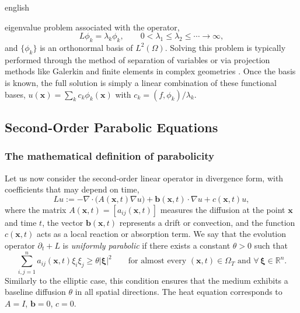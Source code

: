\documentclass[11pt,letterpaper,twoside,openright]{book} %
\newcommand{\abs}[1]{\left\lvert #1 \right\rvert}
\begin{document}
\begin{hyphenrules}{english}
\begin{enumerate}
    eigenvalue problem associated with the operator,
    \begin{equation}
      L\phi_k=\lambda_k\phi_k,\qquad 0<\lambda_1\le\lambda_2\le\cdots\to\infty,
      \label{eq:eigen}
    \end{equation}
    and $\{\phi_k\}$ is an orthonormal basis of $L^2(\Omega)$. Solving this problem is typically
    performed through the method of separation of variables \cite{evans2010} or via projection
    methods like Galerkin and finite elements in complex geometries \cite{zienkiewicz2013}. Once
    the basis is known, the full solution is simply a linear combination of these functional bases,
    $u(\mathbf{x})=\sum_k c_k\phi_k(\mathbf{x})$ with $c_k=(f,\phi_k)/\lambda_k$.
\end{enumerate}

\subsection{Second-Order Parabolic Equations}\label{subsec:parabolic}

\subsubsection{The mathematical definition of parabolicity}
Let us now consider the second-order linear operator in divergence form, with coefficients that may
depend on time,
\begin{equation}
  Lu:=-\nabla\cdot\big(A(\mathbf{x},t)\nabla u\big)+\mathbf{b}(\mathbf{x},t)\cdot\nabla u+c(\mathbf{x},t)u,
  \label{eq:parabolic-op}
\end{equation}
where the matrix $A(\mathbf{x},t)=[a_{ij}(\mathbf{x},t)]$ measures the diffusion at the point $\mathbf{x}$ and time $t$, the
vector $\mathbf{b}(\mathbf{x},t)$ represents a drift or convection, and the function $c(\mathbf{x},t)$ acts as a local reaction
or absorption term. We say that the evolution operator $\partial_t+L$ is \emph{uniformly parabolic} if
there exists a constant $\theta>0$ such that
\begin{equation}
  \sum_{i,j=1}^{n}a_{ij}(\mathbf{x},t)\xi_i\xi_j\ge\theta\abs{\bm\xi}^2\qquad
  \text{for almost every }(\mathbf{x},t)\in\Omega_T\text{ and }\forall\,\bm\xi\in\mathbb{R}^n.
  \label{eq:uniform-parabolicity}
\end{equation}
Similarly to the elliptic case, this condition ensures that the medium exhibits a baseline diffusion
$\theta$ in all spatial directions. The heat equation corresponds to $A=I$, $\mathbf{b}=0$, $c=0$.


\end{hyphenrules}
\end{document}
